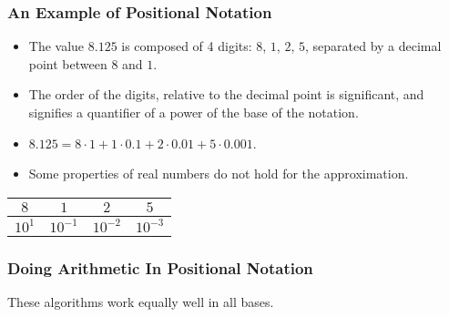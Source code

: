 \begin{frame}

\frametitle{An Example of Positional Notation}

\begin{itemize}

\item The value $8.125$ is composed of 4 digits: $8$, $1$, $2$, $5$, separated
by a decimal point between $8$ and $1$.

\item The order of the digits, relative to the decimal point is significant,
and signifies a quantifier of a power of the base of the notation.

\item $8.125 = 8\cdot 1 + 1 \cdot 0.1 + 2 \cdot 0.01 + 5 \cdot 0.001$.

\item Some properties of real numbers do not hold for the approximation.

\end{itemize}

\begin{center}

\begin{tabular}{cccc}
$8$ & $1$ & $2$ & $5$ \\ \hline
$10^1$ & $10^{-1}$ & $10^{-2}$ & $10^{-3}$
\end{tabular}

\end{center}

\end{frame}

\begin{frame}

\frametitle{Doing Arithmetic In Positional Notation}

\begin{center}

These algorithms work equally well in all bases.

\end{center}

\end{frame}
